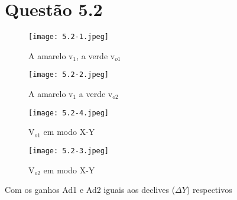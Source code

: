 \documentclass[a4paper,9pt]{extarticle}
\begin{document}
	\section{Questão 5.2}
		 \begin{figure}[H]
                                          \centering
                                          \begin{minipage}{0.45\textwidth}
                                                  \centering
                                                  \texttt{[image: 5.2-1.jpeg]} %
                                                \caption{A amarelo v$_1$, a verde v$_{o1}$}
                                          \end{minipage}\hfill
                                          \begin{minipage}{0.45\textwidth}
                                                  \centering
                                                  \texttt{[image: 5.2-2.jpeg]} %
                                               \caption{A amarelo v$_1$ a verde v$_{o2}$}
                                                  \end{minipage}
                                  \end{figure}
			\begin{figure}[H]
                                            \centering
                                            \begin{minipage}{0.45\textwidth}
                                                    \centering
                                                    \texttt{[image: 5.2-4.jpeg]} %
                                                  \caption{V$_{o1}$ em modo X-Y}
                                            \end{minipage}\hfill
                                            \begin{minipage}{0.45\textwidth}
                                                    \centering
                                                    \texttt{[image: 5.2-3.jpeg]} %
                                                 \caption{V$_{o2}$ em modo X-Y}
                                                    \end{minipage}
                                    \end{figure}
				    Com os ganhos Ad1 e Ad2 iguais aos declives ($\Delta Y$) respectivos
	\newpage
\end{document}
